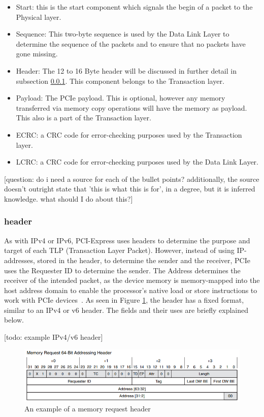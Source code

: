 \begin{itemize}
\item Start: this is the start component which signals the begin of a packet to the Physical layer.
\item Sequence: This two-byte sequence is used by the Data Link Layer to determine the sequence of the packets and to ensure that no packets have gone missing.
\item Header: The 12 to 16 Byte header will be discussed in further detail in subsection \ref{sec:header}. This component belongs to the Transaction layer. 
\item Payload: The PCIe payload. This is optional, however any memory transferred via memory copy operations will have the memory as payload. This also is a part of the Transaction layer.
\item ECRC: a CRC code for error-checking purposes used by the Transaction layer.
\item LCRC: a CRC code for error-checking purposes used by the Data Link Layer.
\end{itemize}

[question: do i need a source for each of the bullet points? additionally, the source doesn't outright state that 'this is what this is for', in a degree, but it is inferred knowledge. what should I do about this?]

\subsubsection{header}
\label{sec:header}
As with IPv4 or IPv6, PCI-Express uses headers to determine the purpose and target of each TLP (Transaction Layer Packet).
However, instead of using IP-addresses, stored in the header, to determine the sender and the receiver, PCIe uses the Requester ID to determine the sender. The Address determines the receiver of the intended packet, as the device memory is memory-mapped into the host address domain to enable the processor's native load or store instructions to work with PCIe devices~\cite{oracle_inc_pci_2010}. As seen in Figure \ref{fig:header}, the header has a fixed format, similar to an IPv4 or v6 header. The fields and their uses are briefly explained below.

[todo: example IPv4/v6 header]

\begin{figure}[htpb]
\includegraphics[width = \linewidth]{figures/PCIE-header}
\caption{An example of a memory request header ~\cite{lawley_understanding_2014}}
\label{fig:header}
\end{figure}

